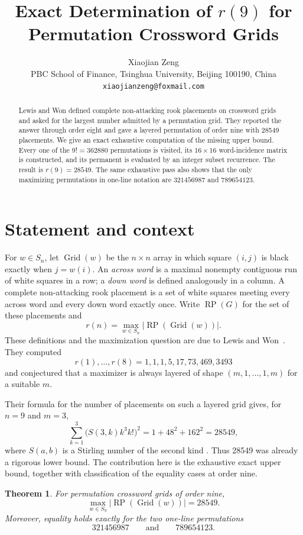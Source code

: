 \documentclass[11pt]{article}
\title{Exact Determination of $r(9)$ for Permutation Crossword Grids}
\author{Xiaojian Zeng\\
  \small PBC School of Finance, Tsinghua University, Beijing 100190, China\\
  \small \texttt{xiaojianzeng@foxmail.com}}
\date{}
\newtheorem{theorem}{Theorem}
\newcommand{\RP}{\operatorname{RP}}
\newcommand{\Grid}{\operatorname{Grid}}
\begin{document}
\maketitle

\begin{abstract}
Lewis and Won defined complete non-attacking rook placements on crossword
grids and asked for the largest number admitted by a permutation grid.  They
reported the answer through order eight and gave a layered permutation of
order nine with 28549 placements.  We give an exact exhaustive computation of
the missing upper bound.  Every one of the $9!=362880$ permutations is
visited, its $16\times16$ word-incidence matrix is constructed, and its
permanent is evaluated by an integer subset recurrence.  The result is
$r(9)=28549$.  The same exhaustive pass also shows that the only maximizing
permutations in one-line notation are $321456987$ and $789654123$.
\end{abstract}

\section{Statement and context}

For $w\in S_n$, let $\Grid(w)$ be the $n\times n$ array in which square
$(i,j)$ is black exactly when $j=w(i)$.  An \emph{across word} is a maximal
nonempty contiguous run of white squares in a row; a \emph{down word} is
defined analogously in a column.  A complete non-attacking rook placement is
a set of white squares meeting every across word and every down word exactly
once.  Write $\RP(G)$ for the set of these placements and
\[
  r(n)=\max_{w\in S_n}|\RP(\Grid(w))|.
\]
These definitions and the maximization question are due to Lewis and
Won~\cite{LewisWon2026}.  They computed
\[
  r(1),\ldots,r(8)=1,1,1,5,17,73,469,3493
\]
and conjectured that a maximizer is always layered of shape
$(m,1,\ldots,1,m)$ for a suitable $m$.

Their formula for the number of placements on such a layered grid gives, for
$n=9$ and $m=3$,
\[
 \sum_{k=1}^{3}\bigl(S(3,k)k^3k!\bigr)^2
 =1+48^2+162^2=28549,
\]
where $S(a,b)$ is a Stirling number of the second kind
\cite[Proposition~3.15]{LewisWon2026}.  Thus 28549 was already a rigorous
lower bound.  The contribution here is the exhaustive exact upper bound,
together with classification of the equality cases at order nine.

\begin{theorem}\label{thm:main}
For permutation crossword grids of order nine,
\[
  \max_{w\in S_9}|\RP(\Grid(w))|=28549.
\]
Moreover, equality holds exactly for the two one-line permutations
\[
  321456987\qquad\text{and}\qquad789654123.
\]
\end{theorem}
\end{document}
